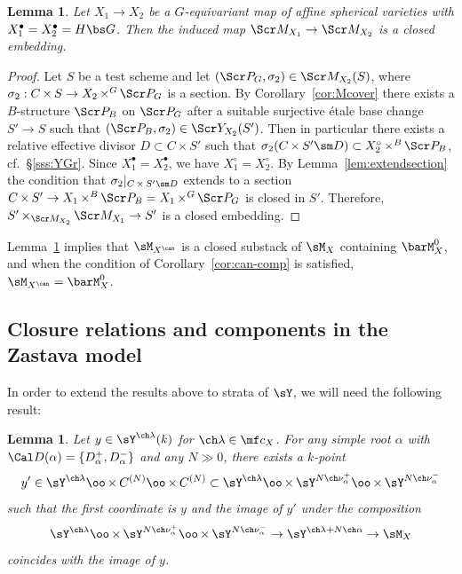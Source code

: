 \documentclass[final]{amsart}
\newtheorem{lem}[subsubsection]{Lemma}
\theoremstyle{remark}
\theoremstyle{definition}
\DeclareMathOperator*{\xt}{\times}
\numberwithin{equation}{section}
\begin{document}
\begin{lem}\label{lem:Membedding}
Let $X_1 \to X_2$ be a $G$-equivariant map of affine spherical varieties with $X_1^\bullet = X_2^\bullet = H\bs G$. Then the induced map $\Scr M_{X_1} \to \Scr M_{X_2}$ is a closed embedding.
\end{lem}
\begin{proof}
Let $S$ be a test scheme and let $(\Scr P_G,\sigma_2) \in \Scr M_{X_2}(S)$, where
$\sigma_2 : C\xt S \to X_2 \xt^G \Scr P_G$ is a section. 
By Corollary~\ref{cor:Mcover} there exists a $B$-structure $\Scr P_B$ 
on $\Scr P_G$ after a suitable surjective \'etale base change $S'\to S$
such that $(\Scr P_B, \sigma_2)\in \Scr Y_{X_2}(S')$. Then in particular
there exists a relative effective divisor $D \subset C\xt S'$ such that 
$\sigma_2(C\xt S' \sm D) \subset X_2^\circ \xt^B \Scr P_B$, cf.~\S\ref{sss:YGr}. 
Since $X_1^\bullet=X_2^\bullet$, we have $X_1^\circ=X_2^\circ$. 
By Lemma~\ref{lem:extendsection} the condition that $\sigma_2|_{C\xt S'\sm D}$
extends to a section $C \xt S' \to X_1 \xt^B \Scr P_B = X_1 \xt^G \Scr P_G$ is
closed in $S'$. Therefore, $S' \xt_{\Scr M_{X_2}} \Scr M_{X_1} \to S'$ is a closed
embedding.
\end{proof}

Lemma~\ref{lem:Membedding} implies that 
$\sM_{X^\can}$ is a closed substack of $\sM_X$ containing $\barM_X^0$, and when the condition
of Corollary~\ref{cor:can-comp} is satisfied, $\sM_{X^\can} = \barM_X^0$.  


\subsection{Closure relations and components in the Zastava model}

In order to extend the results above to strata of $\sY$, we will need the following result:


\begin{lem} \label{lem:Yraise}
Let $y \in \sY^{\ch\lambda}(k)$ for $\ch\lambda \in \mf c_X$.
For any simple root $\alpha$ with $\Cal D(\alpha) = \{ D_\alpha^+, D_\alpha^- \}$ and any $N \gg 0$, there exists
a $k$-point 
\[ y' \in \sY^{\ch\lambda} \oo\xt C^{(N)} \oo\xt C^{(N)} \subset 
\sY^{\ch\lambda} \oo\xt \sY^{N\ch\nu_\alpha^+} \oo\xt \sY^{N\ch\nu_\alpha^-} 
\] 
such that the first coordinate is $y$ and the image of $y'$ under 
the composition
\[ 
    \sY^{\ch\lambda} \oo\xt \sY^{N\ch\nu_\alpha^+} \oo \xt
    \sY^{N\ch\nu_\alpha^-} \to 
    \sY^{\ch\lambda+N\ch\alpha} \to \sM_X 
\]
coincides with the image of $y$.
\end{lem}
\end{document}
